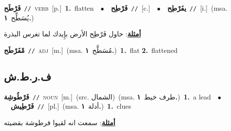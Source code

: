 \documentclass[10pt,a4paper,twoside]{article} %
\begin{document}
\begin{multicols}{2}
{\setlength\topsep{0pt}\textbf{\foreignlanguage{arabic}{فَرْطَح}}\ {\color{gray}\texttt{//}\color{black}}\ \textsc{verb}\ [p.]\ \textbf{1.}~flatten\ \ $\bullet$\ \ \setlength\topsep{0pt}\textbf{\foreignlanguage{arabic}{فَرْطِح}}\ {\color{gray}\texttt{//}\color{black}}\ [c.]\ \ $\bullet$\ \ \setlength\topsep{0pt}\textbf{\foreignlanguage{arabic}{يفَرْطِح}}\ {\color{gray}\texttt{//}\color{black}}\ [i.]\ \color{gray}(msa. \foreignlanguage{arabic}{يُسَطِّح}~\foreignlanguage{arabic}{\textbf{١.}})\color{black}\  \begin{flushright}\color{gray}\foreignlanguage{arabic}{\textbf{\underline{\foreignlanguage{arabic}{أمثلة}}}: حاول فَرْطِح الأرض بإِيدك لما تغرس البذرة}\end{flushright}\color{black}} \vspace{2mm}

{\setlength\topsep{0pt}\textbf{\foreignlanguage{arabic}{مْفَرْطَح}}\ {\color{gray}\texttt{//}\color{black}}\ \textsc{adj}\ [m.]\ \color{gray}(msa. \foreignlanguage{arabic}{مُسَطَّح}~\foreignlanguage{arabic}{\textbf{١.}})\color{black}\ \textbf{1.}~flat  \textbf{2.}~flattened\ } \vspace{2mm}

\vspace{-3mm}
\subsection*{\color{blue}\foreignlanguage{arabic}{ف.ر.ط.ش}\color{blue}{}} 

{\setlength\topsep{0pt}\textbf{\foreignlanguage{arabic}{فَرْطُوشِة}}\ {\color{gray}\texttt{//}\color{black}}\ \textsc{noun}\ [m.]\ (src. \color{gray}\foreignlanguage{arabic}{الشمال}\color{black})\ \color{gray}(msa. \foreignlanguage{arabic}{طرف خيط}~\foreignlanguage{arabic}{\textbf{١.}})\color{black}\ \textbf{1.}~a lead\ \ $\bullet$\ \ \setlength\topsep{0pt}\textbf{\foreignlanguage{arabic}{فَرْطِيش}}\ {\color{gray}\texttt{//}\color{black}}\ [pl.]\ \color{gray}(msa. \foreignlanguage{arabic}{أدلة}~\foreignlanguage{arabic}{\textbf{١.}})\color{black}\ \textbf{1.}~clues\  \begin{flushright}\color{gray}\foreignlanguage{arabic}{\textbf{\underline{\foreignlanguage{arabic}{أمثلة}}}: سمعت انه لقيوا فرطوشة بقضيته}\end{flushright}\color{black}} \vspace{2mm}


\end{multicols}
\end{document}
